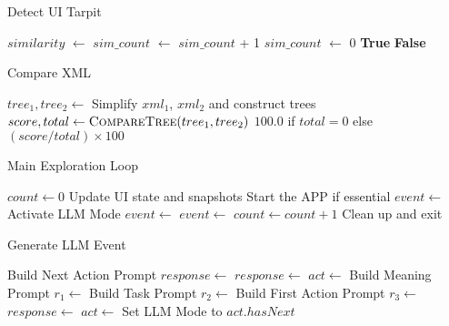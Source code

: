\documentclass{article}
\begin{document}
\begin{algorithm}
\caption{Detect UI Tarpit}
\begin{algorithmic}[1]
    \State $similarity$ $\gets$ 
    \State $sim\_count$ $\gets$ $sim\_count$ + 1
        \State $sim\_count$ $\gets$ 0
        \State \Return \textbf{True}
    \EndIf
\EndIf
\State \Return \textbf{False}
\EndFunction
\end{algorithmic}
\end{algorithm}

\begin{algorithm}
\caption{Compare XML}
\begin{algorithmic}[1]
    \State $tree_1, tree_2 \gets$ Simplify $xml_1$, $xml_2$ and construct trees
    \State $score, total \gets \Call{CompareTree}{tree_1, tree_2}$
    \State \Return $100.0$ if $total = 0$ else $(score / total) \times 100$
\EndFunction
\end{algorithmic}
\end{algorithm}

\begin{algorithm}
\caption{Main Exploration Loop}
\begin{algorithmic}[1]
  \State $count \gets 0$
    \State Update UI state and snapshots
    \State Start the APP if essential
        \State $event \gets$ 
        \State Activate LLM Mode
        \State $event \gets$ 
    \Else
        \State $event \gets$ 
    \EndIf
    \State {}
    \State $count \gets count + 1$
  \EndWhile
  \State Clean up and exit
\EndFunction
\end{algorithmic}
\end{algorithm}

\begin{algorithm}
\caption{Generate LLM Event}
\begin{algorithmic}[1]
          \State Build Next Action Prompt
          \State $response \gets$ 
          \State $response \gets$ 
          \State $act \gets$ 
        \Else
          \State Build Meaning Prompt
          \State $r_1 \gets$ 
          \State Build Task Prompt
          \State $r_2 \gets$ 
          \State Build First Action Prompt
          \State $r_3 \gets$ 
          \State $response \gets$ 
          \State $act \gets$ 
    \EndIf
    \State Set LLM Mode to $act.hasNext$
    \State \Return {}
\EndFunction
\end{algorithmic}
\end{algorithm}
\end{document}
